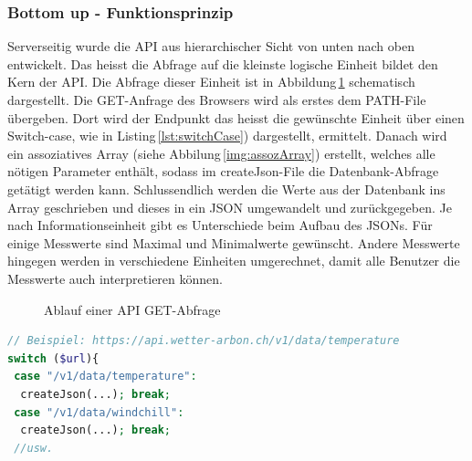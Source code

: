 \subsubsection{Bottom up - Funktionsprinzip}
Serverseitig wurde die API aus hierarchischer Sicht von unten nach oben entwickelt. Das heisst die Abfrage auf die kleinste logische Einheit bildet den Kern der API. Die Abfrage dieser Einheit ist in Abbildung\,\ref{img:APIFiles} schematisch dargestellt. Die GET-Anfrage des Browsers wird als erstes dem PATH-File übergeben. Dort wird der Endpunkt das heisst die gewünschte Einheit über einen Switch-case, wie in Listing\,\ref{lst:switchCase}) dargestellt, ermittelt. Danach wird ein assoziatives Array (siehe Abbilung\,\ref{img:assozArray}) erstellt, welches alle nötigen Parameter enthält, sodass im createJson-File die Datenbank-Abfrage getätigt werden kann. Schlussendlich werden die Werte aus der Datenbank ins Array geschrieben und dieses in ein JSON umgewandelt und zurückgegeben. Je nach Informationseinheit gibt es Unterschiede beim Aufbau des JSONs. Für einige Messwerte sind Maximal und Minimalwerte gewünscht. Andere Messwerte hingegen werden in verschiedene Einheiten umgerechnet, damit alle Benutzer die Messwerte auch interpretieren können.

\begin{figure}[htbp!]
	\centering
	\caption{Ablauf einer API GET-Abfrage}
	\label{img:APIFiles}
\end{figure}


\vspace{3mm}
\begin{lstlisting}[label=lst:switchCase,caption=Routing der URL auf die richtige DB-Abfrage, language=php, style=php]
// Beispiel: https://api.wetter-arbon.ch/v1/data/temperature
switch ($url){
 case "/v1/data/temperature":
  createJson(...); break;
 case "/v1/data/windchill":
  createJson(...); break;
 //usw.
\end{lstlisting}
\vspace{3mm}


